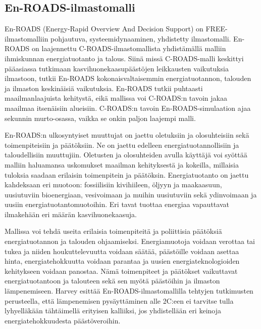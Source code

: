 \documentclass[finnish,12pt,a4paper,pdftex]{article}
\begin{document}
\begin{onehalfspacing}
\clearpage

\subsection{En-ROADS-ilmastomalli \label{ilmasto:enroads}}

En-ROADS (Energy-Rapid Overview And Decision Support) on FREE-ilmastomalliin pohjautuva, systeemidynaaminen, yhdistetty ilmastomalli. En-ROADS on laajennettu C-ROADS-ilmastomallista yhdistämällä malliin ihmiskunnan energiatuotanto ja talous. Siinä missä C-ROADS-malli keskittyi pääasiassa tutkimaan kasvihuonekaasupäästöjen leikkausten vaikutuksia ilmastoon, tutkii En-ROADS kokonaisvaltaisemmin energiatuotannon, talouden ja ilmaston keskinäisiä vaikutuksia. En-ROADS tutkii puhtaasti maailmanlaajuista kehitystä, eikä mallissa voi C-ROADS:n tavoin jakaa maailmaa itsenäisiin alueisiin. C-ROADS:n tavoin En-ROADS-simulaation ajaa sekunnin murto-osassa, vaikka se onkin paljon laajempi malli. \cite{EnroadsWWW, Harvey2013, Enroads} 

En-ROADS:n ulkosyntyiset muuttujat on jaettu oletuksiin ja olosuhteisiin sekä toimenpiteisiin ja päätöksiin. Ne on jaettu edelleen energiatuotannollisiin ja taloudellisiin muuttujiin. Oletusten ja olosuhteiden avulla käyttäjä voi syöttää malliin haluamansa uskomukset maailman kehityksestä ja kokeilla, millaisia tuloksia saadaan erilaisin toimenpitein ja päätöksin. Energiatuotanto on jaettu kahdeksaan eri muotoon: fossiilisiin kivihiileen, öljyyn ja maakaasuun, uusiutuviin bioenergiaan, vesivoimaan ja muihin uusiutuviin sekä ydinvoimaan ja uusiin energiatuotantomuotoihin. Eri tavat tuottaa energiaa vapauttavat ilmakehään eri määrän kasvihuonekaasuja. \cite{Enroads}

Mallissa voi tehdä useita erilaisia toimenpiteitä ja poliittisia päätöksiä energiatuotannon ja talouden ohjaamiseksi. Energiamuotoja voidaan verottaa tai tukea ja niiden houkuttelevuutta voidaan säätää, päästöille voidaan asettaa hinta, energiatehokkuutta voidaan parantaa ja uusien energiateknologioiden kehitykseen voidaan panostaa. Nämä toimenpiteet ja päätökset vaikuttavat energiatuotantoon ja talouteen sekä sen myötä päästöihin ja ilmaston lämpenemiseen. \cite{Harvey2013, Enroads} Harvey \cite{Harvey2013} esittää En-ROADS-ilmastomallilla tehtyjen tutkimusten perusteella, että lämpenemisen pysäyttäminen alle 2\degree C:een ei tarvitse tulla lyhyelläkään tähtäimellä erityisen kalliiksi, jos yhdistellään eri keinoja energiatehokkuudesta päästöveroihin. 


\end{onehalfspacing}
\end{document}
